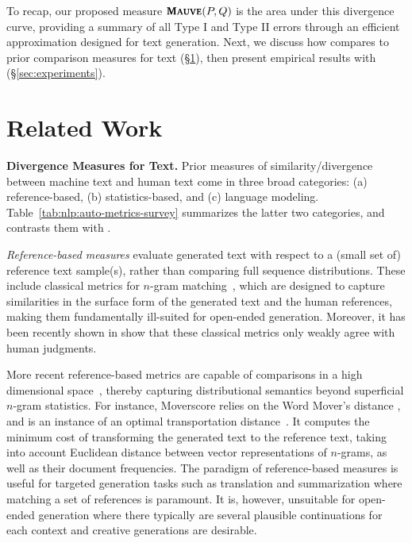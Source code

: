 \documentclass{article}
\newcommand{\myparagraph}[1]{\par\noindent\textbf{{#1}.}} %
\theoremstyle{definition}
\newcommand{\name}{{\fontfamily{bch}\selectfont{\textsc{Mauve}}}\xspace}
\begin{document}
To recap, our proposed measure $\textbf{\name}{(P,Q)}$ is the area under this divergence curve, providing a summary of all Type I and Type II errors through an efficient approximation designed for text generation.
Next, we discuss how \name compares to prior comparison measures for text (\S\ref{sec:background}), then present empirical results with \name (\S\ref{sec:experiments}).

\section{Related Work}
\label{sec:background}

%
%
%
%
%

%
%
%
%


%
%

\myparagraph{Divergence Measures for Text}
Prior measures of similarity/divergence between 
machine text and human text come in three broad categories: (a) reference-based, (b) statistics-based, and (c) language modeling.
Table~\ref{tab:nlp:auto-metrics-survey} summarizes the latter two categories, and contrasts them with \name. 

\textit{Reference-based measures} evaluate generated text with respect to a (small set of) reference text sample(s), rather than comparing full sequence distributions.
These include classical metrics for $n$-gram matching~\cite{papineni2002bleu,lin2004rouge,banerjee2005meteor},
which are designed to capture similarities in the surface form of the generated text and the human references, making them fundamentally ill-suited for open-ended generation. 
Moreover, it has been recently shown in \cite{novikova2017need} show that these classical metrics only weakly agree with human judgments.

More recent reference-based metrics are capable of comparisons in a high dimensional space~\cite{shimanaka2018ruse,zhang2020bertscore,sellam2020bleurt,clark2019sentence}, thereby capturing distributional semantics beyond superficial $n$-gram statistics.
For instance, Moverscore \cite{zhao2019moverscore} relies on the Word Mover's distance \cite{kusner2015word}, 
and is an instance of an optimal transportation distance~\cite{villani2021topics}.
It computes the minimum cost of transforming the generated text to the reference text, taking into account Euclidean distance between vector representations of $n$-grams, as well as their document frequencies.
%
The paradigm of reference-based measures is useful for targeted generation tasks such as translation and summarization where matching a set of references is paramount. It is, however, unsuitable for open-ended generation where there typically are several plausible continuations for each context and creative generations are desirable.
\end{document}
